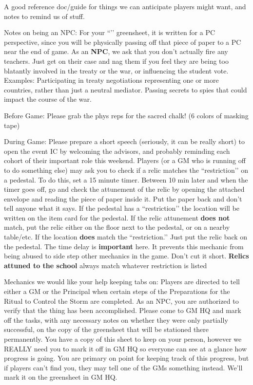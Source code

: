 \documentclass[green]{GL2020}
\begin{document}
\name{\gNPCGuide{}}

A good reference doc/guide for things we can anticipate players might want, and notes to remind us of stuff.


Notes on being an NPC:
For your ``\gHireTeacher{}’’ greensheet, it is written for a PC perspective, since you will be physically passing off that piece of paper to a PC near the end of game. As an \textbf{NPC}, we ask that you don’t actually fire any teachers. Just get on their case and nag them if you feel they are being too blatantly involved in the treaty or the war, or influencing the student vote. Examples:
Participating in treaty negotiations representing one or more countries, rather than just a neutral mediator.
Passing secrets to spies that could impact the course of the war.



Before Game:
Please grab the phys reps for the sacred chalk! (6 colors of masking tape)

During Game:
Please prepare a short speech (seriously, it can be really short) to open the event IC by welcoming the advisors, and probably reminding each cohort of their important role this weekend.
Players (or a GM who is running off to do something else) may ask you to check if a relic matches the ``restriction’’ on a pedestal. To do this, set a 15 minute timer. Between 10 min later and when the timer goes off, go and check the attunement of the relic by opening the attached envelope and reading the piece of paper inside it. Put the paper back and don’t tell anyone what it says. If the pedestal has a ``restriction’’ the location will be written on the item card for the pedestal. If the relic attunement \textbf{does not} match, put the relic either on the floor next to the pedestal, or on a nearby table/etc. If the location \textbf{does} match the ``restriction.’’ Just put the relic back on the pedestal.
The time delay is \textbf{important} here. It prevents this mechanic from being abused to side step other mechanics in the game. Don’t cut it short.
\textbf{Relics attuned to the school} always match whatever restriction is listed

Mechanics we would like your help keeping tabs on:
Players are directed to tell either a GM or the Principal when certain steps of the Preparations for the Ritual to Control the Storm are completed. As an NPC, you are authorized to verify that the thing has been accomplished. Please come to GM HQ and mark off the tasks, with any necessary notes on whether they were only partially successful, on the copy of the \gPreparingTheRitual{} greensheet that will be stationed there permanently.
You have a copy of this sheet to keep on your person, however we REALLY need you to mark it off in GM HQ so everyone can see at a glance how progress is going.
You are primary on point for keeping track of this progress, but if players can’t find you, they may tell one of the GMs something instead. We’ll mark it on the greensheet in GM HQ.
\end{document}
